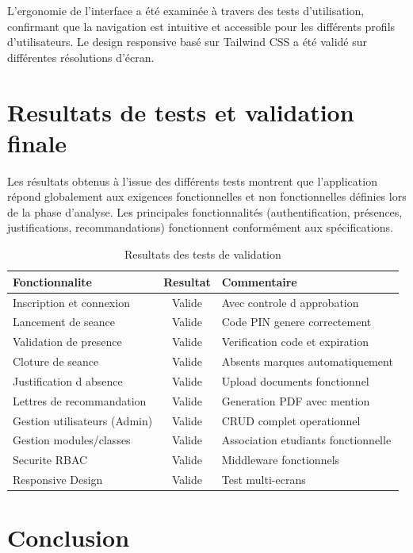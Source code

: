 \documentclass[12pt, a4paper, openright]{report}
\begin{document}
L'ergonomie de l'interface a été examinée à travers des tests d'utilisation, confirmant que la navigation est intuitive et accessible pour les différents profils d'utilisateurs. Le design responsive basé sur Tailwind CSS a été validé sur différentes résolutions d'écran.

\section{Resultats de tests et validation finale}

Les résultats obtenus à l'issue des différents tests montrent que l'application répond globalement aux exigences fonctionnelles et non fonctionnelles définies lors de la phase d'analyse. Les principales fonctionnalités (authentification, présences, justifications, recommandations) fonctionnent conformément aux spécifications.

\begin{table}[H]
    \centering
    \begin{tabular}{|l|c|l|}
    \hline
    \textbf{Fonctionnalite} & \textbf{Resultat} & \textbf{Commentaire} \\
    \hline
    Inscription et connexion & Valide & Avec controle d approbation \\
    Lancement de seance & Valide & Code PIN genere correctement \\
    Validation de presence & Valide & Verification code et expiration \\
    Cloture de seance & Valide & Absents marques automatiquement \\
    Justification d absence & Valide & Upload documents fonctionnel \\
    Lettres de recommandation & Valide & Generation PDF avec mention \\
    Gestion utilisateurs (Admin) & Valide & CRUD complet operationnel \\
    Gestion modules/classes & Valide & Association etudiants fonctionnelle \\
    Securite RBAC & Valide & Middleware fonctionnels \\
    Responsive Design & Valide & Test multi-ecrans \\
    \hline
    \end{tabular}
    \caption{Resultats des tests de validation}
    \label{table:tests}
\end{table}

\section{Conclusion}
\end{document}
